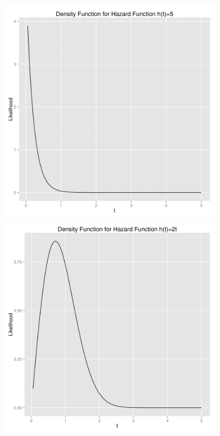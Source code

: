 \documentclass[letter]{article}
\begin{document}
\begin{figure}[H]
\centering
\includegraphics[scale=.33]{figures/3_constant.png}
\includegraphics[scale=.33]{figures/3_increasing.png}
\end{figure}
\end{document}
